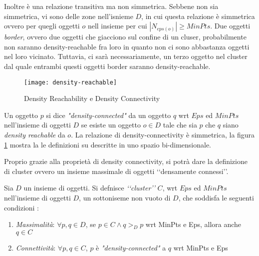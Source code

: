 Inoltre è una relazione transitiva ma non simmetrica. Sebbene non sia simmetrica, vi sono delle zone nell'isnieme $D$, in cui questa relazione è simmetrica ovvero  per quegli oggetti $o$ nell insieme per cui $|N_{eps(o)}| \ge MinPts$. Due oggetti \emph{border}, ovvero due oggetti che giacciono sul confine di un cluser, probabilmente non saranno density-reachable fra loro in quanto non ci sono abbastanza oggetti nel loro vicinato. Tuttavia, ci sarà necessariamente, un terzo oggetto nel cluster dal quale entrambi questi  oggetti border saranno density-reachable.
\begin{figure}
\centering
\texttt{[image: density-reachable]}
\caption{Density Reachability e Density Connectivity}
\label{fig:dens-reach}
\end{figure}
\begin{definizione}
\label{def:dc}
Un oggetto $p$ si dice 	\emph{"density-connected"} da un oggetto $q$ wrt $Eps$ ed $MinPts$ nell'insieme di oggetti $D$ se esiste un oggetto $o \in D$  tale che sia $p$ che $q$ siano \emph{ density reachable} da $o$. La relazione di density-connectivity è simmetrica, la figura \ref{fig:dens-reach} mostra la le definizioni su descritte in uno spazio bi-dimensionale. 
\end{definizione} 
Proprio grazie alla proprietà di density connectivity, si potrà dare la definizione di cluster ovvero un insieme massimale di oggetti \lq\lq densamente connessi\rq\rq.
\begin{definizione}[cluster]
\label{def:cluster}
Sia $D$ un insieme di oggetti.
Si defnisce \emph{\lq\lq cluster\rq\rq}  $C$,  wrt $Eps$ ed $MinPts$ nell'insieme di oggetti $D$,
un sottoniseme non vuoto di $D$, che soddisfa le seguenti condizioni :
\begin{enumerate}
\item \emph{Massimalità}: $\forall p,q\in D$, se $p \in C \land q>_{D}p$ wrt MinPts e Eps, 
allora anche $q \in C  $

\item \emph{Connettività}: $\forall p,q\in C$, $p$ è \emph{"density-connected"} a $q$  wrt MinPts e Eps

\end{enumerate}
 
\end{definizione} 


